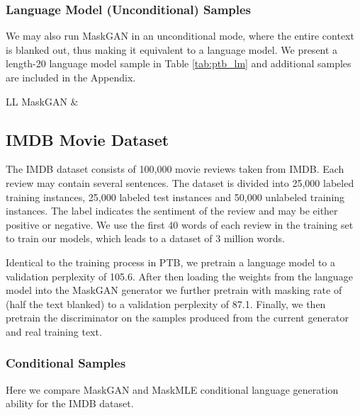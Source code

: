 \subsubsection{Language Model (Unconditional) Samples}
We may also run MaskGAN in an unconditional mode, where the entire context is blanked out, thus making it equivalent to a language model.  We present a length-20 language model sample in Table \ref{tab:ptb_lm} and additional samples are included in the Appendix. 

\begin{table}[ht]
  \begin{tabular}{LL} \toprule
    MaskGAN &  \\\bottomrule

  \end{tabular}
  \caption{Language model (unconditional) sample from PTB for MaskGAN.}
  \label{tab:ptb_lm}
\end{table}



\subsection{IMDB Movie Dataset}
The IMDB dataset \cite{maas2011learning} consists of 100,000 movie reviews taken from IMDB.  Each review may contain several sentences.  The dataset is divided into 25,000 labeled training instances, 25,000 labeled test instances and 50,000 unlabeled training instances.  The label indicates the sentiment of the review and may be either positive or negative.  We use the first 40 words of each review in the training set to train our models, which leads to a dataset of 3 million words.

Identical to the training process in PTB, we pretrain a language model to a validation perplexity of 105.6.  After then loading the weights from the language model into the MaskGAN generator we further pretrain with masking rate of  (half the text blanked) to a validation perplexity of 87.1.  Finally, we then pretrain the discriminator on the samples produced from the current generator and real training text.

\subsubsection{Conditional Samples}
Here we compare MaskGAN and MaskMLE conditional language generation ability for the IMDB dataset. 

